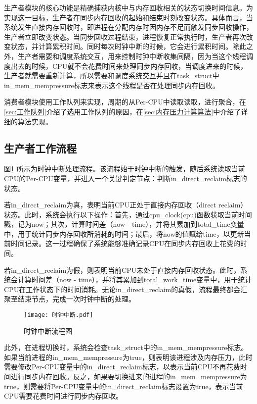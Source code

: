 生产者模块的核心功能是精确捕获内核中与内存回收相关的状态切换时间信息。为实现这一目标，生产者在同步内存回收的起始和结束时刻改变状态。具体而言，当系统发生直接内存回收时，即进程在分配内存时因内存不足而触发同步回收操作，生产者立即改变状态。当同步回收过程结束，进程恢复正常执行时，生产者再次改变状态，并计算累积时间。同时每次时钟中断的时候，它会进行累积时间。除此之外，生产者需要和调度系统交互，用来控制时钟中断收集间隔，因为当这个线程调度出去的时候，CPU就不会花费时间来处理同步内存回收，当调度进来的时候，生产者就需要重新计算，所以需要和调度系统交互并且在task\_struct中in\_mem\_mempressure标志来表示这个线程是否在处理同步内存回收。

消费者模块使用工作队列来实现，周期的从Per-CPU中读取读取，进行聚合，在\ref{sec:工作队列}介绍了选用工作队列的原因，在\ref{sec:内存压力计算算法}中介绍了详细的算法实现。


\subsection{生产者工作流程}

图\ref{fig:time-ticker} 所示为时钟中断处理流程。该流程始于时钟中断的触发，随后系统读取当前CPU的Per-CPU变量，并进入一个关键判定节点：判断in\_direct\_reclaim标志的状态。

若in\_direct\_reclaim为真，表明当前CPU正处于直接内存回收（direct reclaim）状态。此时，系统会执行以下操作：首先，通过cpu\_clock(cpu)函数获取当前时间戳，记为now；其次，计算时间差（now - time），并将其累加到total\_time变量中，用于统计同步内存回收所消耗的时间；最后，将now的值赋给time，以更新当前时间记录。这一过程确保了系统能够准确记录CPU在同步内存回收上花费的时间。

若in\_direct\_reclaim为假，则表明当前CPU未处于直接内存回收状态。此时，系统会计算时间差（now - time），并将其累加到total\_work\_time变量中，用于统计CPU在工作状态下的时间消耗。无论in\_direct\_reclaim的真假，流程最终都会汇聚至结束节点，完成一次时钟中断的处理。

\begin{figure}[htbp]
    \centering
    \texttt{[image: 时钟中断.pdf]}
    \caption{时钟中断流程图}
    \label{fig:time-ticker}
\end{figure}

此外，在进程切换时，系统会检查task\_struct中的in\_mem\_mempressure标志。如果当前进程的in\_mem\_mempressure为true，则表明该进程涉及内存压力，此时需要修改Per-CPU变量中的in\_direct\_reclaim标志，以表示当前CPU不再花费时间进行同步内存回收。反之，如果要切换进来的进程的in\_mem\_mempressure为true，则需要将Per-CPU变量中的in\_direct\_reclaim标志设置为true，表示当前CPU需要花费时间进行同步内存回收。

